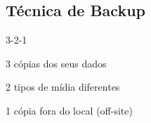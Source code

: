 \subsection{Técnica de Backup}
\begin{frame}{3-2-1}
	\begin{wideitemize}
		\item 3 cópias dos seus dados
		\item 2 tipos de mídia diferentes
		\item 1 cópia fora do local (off-site)
	\end{wideitemize}
\end{frame}

